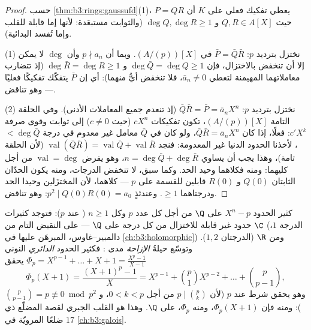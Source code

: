 \begin{proof}
حسب \cref{thm:b3:rings:gaussufd}(1)، يعطي تفكيك فعلي على $K$ أن $P = QR$ حيث
$Q, R \in A[X]$ و $\deg Q, \deg R \geq 1$ (والثوابت مستبعَدة: لأنها إما قابلة
للقلب وإما تُفسد البدائية).

(1) نختزل بترديد $p$: $\bar P = \bar Q\bar R$ في $(A/(p))[X]$. وبما أن
$p \nmid a_n$ وأن $\deg$ لا يمكن إلا أن تنخفض بالاختزال، فإن
$\deg \bar
Q = \deg Q \geq 1$ و $\deg\bar R = \deg R \geq 1$ (إذ تتضارب معاملاتهما المهيمنة لتعطي $\bar a_n \neq 0$،
فلا تنخفض أيٌّ منهما): أي إن $\bar P$ يتفكّك تفكيكًا فعليًا ---
وهو تناقض.

(2) نختزل بترديد $p$: $\bar Q \bar R = \bar P = \bar a_n X^n$ (إذ تنعدم جميع المعاملات الأدنى).
وفي الحلقة التامة $(A/(p))[X]$، تكون تفكيكات $cX^n$ (حيث
$c \ne 0$) إلى ثوابت وقوى صرفة $c'X^k$: فعلًا، إذا كان $\bar Q\bar R = \bar a_nX^n$،
ولو كان في $\bar Q$ معامل غير معدوم في درجة $< \deg\bar Q$،
لأخذنا الحدود الدنيا غير المعدومة: فنجد $\operatorname{val}(\bar Q\bar R) =
\operatorname{val}\bar Q + \operatorname{val}\bar R$ (لأن الحلقة
تامة)، وهذا يجب أن يساوي $n = \deg\bar Q + \deg\bar R$، وهو يفرض $\operatorname{val} = \deg$ من أجل
كليهما: ومنه فكلاهما وحيد الحد. وكما سبق، لا تنخفض الدرجات،
ومنه يكون الحدّان الثابتان $Q(0)$ و $R(0)$ قابلين للقسمة على
$p$ --- كلاهما، لأن المختزَلين وحيدا الحد ودرجتاهما $\geq 1$.
وعندئذٍ $p^2 \mid
Q(0)R(0) = a_0$: وهو تناقض.
\end{proof}

\begin{example}\label{ex:b3:rings:eisenstein}
كثير الحدود $X^n - p$  على $\Q$ من أجل كل عدد
 $p$ وكل $n
\geq 1$ ( عند $p$): فتوجد كثيرات حدود غير
قابلة للاختزال من كل درجة على $\Q$ --- على النقيض التام من $\C$
(الدرجة $1$، دالمبير--غاوس، المبرهَن عليها في \cref{ch:b3:holomorphic}) ومن
$\R$ (الدرجتان $1, 2$). وتوسّع حيلةُ \emph{الإزاحة} مدى
: فكثير الحدود \emph{الدائري}
النوني  $\Phi_p = X^{p-1} +
\dots + X + 1 = \frac{X^p - 1}{X - 1}$ يحقق
\[
\Phi_p(X + 1) = \frac{(X+1)^p - 1}{X}
= X^{p-1} + \binom{p}{1}X^{p-2} + \dots + \binom{p}{p-1},
\]
وهو يحقق شرط  عند $p$ (لأن $p \mid \binom pk$ من أجل $0 < k < p$،
و $\binom{p}{p-1} = p \not\equiv 0 \bmod p^2$): ومنه فإن $\Phi_p(X+1)$، ومنه $\Phi_p$،  على $\Q$. وهذا هو القلب الجبري لقصة المضلّع ذي $17$
ضلعًا المرويّة في \cref{ch:b3:galois}.
\end{example}

